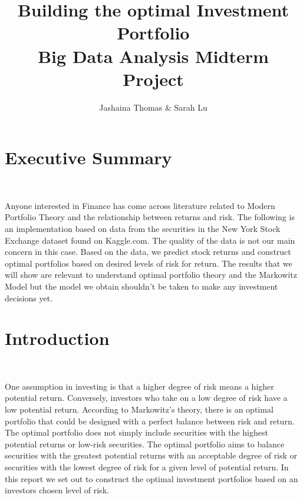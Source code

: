 \documentclass[11pt, oneside]{article}   	%
\title{Building the optimal Investment Portfolio \\ Big Data Analysis Midterm Project}
\author{Jashaina Thomas \& Sarah Lu}
\begin{document}
\maketitle

\newpage

\tableofcontents

\newpage
\section{Executive Summary} \

Anyone interested in Finance has come across literature related to Modern Portfolio Theory and the relationship between returns and risk. The following is an implementation based on data from the securities in the New York Stock Exchange dataset found on Kaggle.com. The quality of the data is not our main concern in this case. Based on the data, we predict stock returns and construct optimal portfolios based on desired levels of risk for return. The results that we will show are relevant to understand optimal portfolio theory and the Markowitz Model but the model we obtain shouldn't be taken to make any investment decisions yet. 

\section{Introduction} \

One assumption in investing is that a higher degree of risk means a higher potential return. Conversely, investors who take on a low degree of risk have a low potential return. According to Markowitz's theory, there is an optimal portfolio that could be designed with a perfect balance between risk and return. The optimal portfolio does not simply include securities with the highest potential returns or low-risk securities. The optimal portfolio aims to balance securities with the greatest potential returns with an acceptable degree of risk or securities with the lowest degree of risk for a given level of potential return. In this report we set out to construct the optimal investment portfolios based on an investors chosen level of risk. \\
\end{document}
